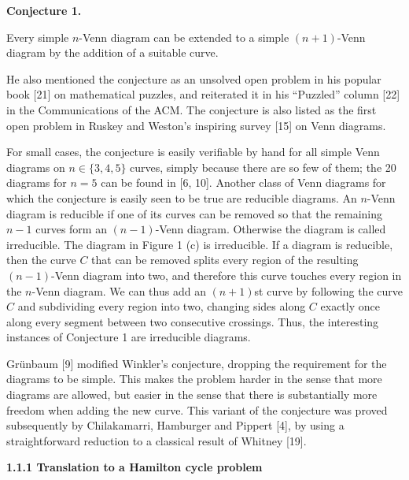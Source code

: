 \par\medskip\noindent\textbf{Conjecture 1.}\par
Every simple $n$-Venn diagram can be extended to a simple $(n+1)$-Venn diagram by the addition of a suitable curve.
\par
\par
\par
He also mentioned the conjecture as an unsolved open problem in his popular book [21] on mathematical puzzles, and reiterated it in his “Puzzled” column [22] in the Communications of the ACM. The conjecture is also listed as the first open problem in Ruskey and Weston’s inspiring survey [15] on Venn diagrams.
\par
\par
For small cases, the conjecture is easily verifiable by hand for all simple Venn diagrams on $n\in\{3,4,5\}$ curves, simply because there are so few of them; the 20 diagrams for $n=5$ can be found in [6, 10]. Another class of Venn diagrams for which the conjecture is easily seen to be true are reducible diagrams. An $n$-Venn diagram is reducible if one of its curves can be removed so that the remaining $n-1$ curves form an $(n-1)$-Venn diagram. Otherwise the diagram is called irreducible. The diagram in Figure 1 (c) is irreducible. If a diagram is reducible, then the curve $C$ that can be removed splits every region of the resulting $(n-1)$-Venn diagram into two, and therefore this curve touches every region in the $n$-Venn diagram. We can thus add an $(n+1)$st curve by following the curve $C$ and subdividing every region into two, changing sides along $C$ exactly once along every segment between two consecutive crossings. Thus, the interesting instances of Conjecture 1 are irreducible diagrams.
\par
\par
Grünbaum [9] modified Winkler’s conjecture, dropping the requirement for the diagrams to be simple. This makes the problem harder in the sense that more diagrams are allowed, but easier in the sense that there is substantially more freedom when adding the new curve. This variant of the conjecture was proved subsequently by Chilakamarri, Hamburger and Pippert [4], by using a straightforward reduction to a classical result of Whitney [19].
\par
\par
\par\medskip\noindent\textbf{1.1.1 Translation to a Hamilton cycle problem}\par
